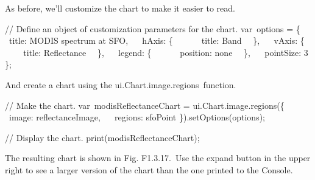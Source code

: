 \documentclass[
  letterpaper,
  DIV=11,
  numbers=noendperiod]{scrreprt}
\newenvironment{Shaded}{\begin{snugshade}}{\end{snugshade}}
\newcommand{\AttributeTok}[1]{\textcolor[rgb]{0.40,0.45,0.13}{#1}}
\newcommand{\CommentTok}[1]{\textcolor[rgb]{0.37,0.37,0.37}{#1}}
\newcommand{\DataTypeTok}[1]{\textcolor[rgb]{0.68,0.00,0.00}{#1}}
\newcommand{\DecValTok}[1]{\textcolor[rgb]{0.68,0.00,0.00}{#1}}
\newcommand{\FunctionTok}[1]{\textcolor[rgb]{0.28,0.35,0.67}{#1}}
\newcommand{\NormalTok}[1]{\textcolor[rgb]{0.00,0.23,0.31}{#1}}
\newcommand{\OperatorTok}[1]{\textcolor[rgb]{0.37,0.37,0.37}{#1}}
\newcommand{\StringTok}[1]{\textcolor[rgb]{0.13,0.47,0.30}{#1}}
\begin{document}
As before, we'll customize the chart to make it easier to read.

\begin{Shaded}
\begin{Highlighting}[]
\CommentTok{// Define an object of customization parameters for the chart.  }
\NormalTok{var options }\OperatorTok{=}\NormalTok{ \{  }
  \DataTypeTok{ title}\OperatorTok{:} \StringTok{\textquotesingle{}MODIS spectrum at SFO\textquotesingle{}}\OperatorTok{,}  
  \DataTypeTok{ hAxis}\OperatorTok{:}\NormalTok{ \{  }
      \DataTypeTok{ title}\OperatorTok{:} \StringTok{\textquotesingle{}Band\textquotesingle{}}\NormalTok{   \}}\OperatorTok{,}  
  \DataTypeTok{ vAxis}\OperatorTok{:}\NormalTok{ \{  }
      \DataTypeTok{ title}\OperatorTok{:} \StringTok{\textquotesingle{}Reflectance\textquotesingle{}}\NormalTok{   \}}\OperatorTok{,}  
  \DataTypeTok{ legend}\OperatorTok{:}\NormalTok{ \{  }
      \DataTypeTok{ position}\OperatorTok{:} \StringTok{\textquotesingle{}none\textquotesingle{}}\NormalTok{   \}}\OperatorTok{,}  
  \DataTypeTok{ pointSize}\OperatorTok{:} \DecValTok{3}  
\NormalTok{\}}\OperatorTok{;}
\end{Highlighting}
\end{Shaded}

And create a chart using the ui.Chart.image.regions~function.

\begin{Shaded}
\begin{Highlighting}[]
\CommentTok{// Make the chart.  }
\NormalTok{var modisReflectanceChart }\OperatorTok{=}\NormalTok{ ui}\OperatorTok{.}\AttributeTok{Chart}\OperatorTok{.}\AttributeTok{image}\OperatorTok{.}\FunctionTok{regions}\NormalTok{(\{  }
  \DataTypeTok{ image}\OperatorTok{:}\NormalTok{ reflectanceImage}\OperatorTok{,}  
  \DataTypeTok{ regions}\OperatorTok{:}\NormalTok{ sfoPoint  }
\NormalTok{\})}\OperatorTok{.}\FunctionTok{setOptions}\NormalTok{(options)}\OperatorTok{;}  
  
\CommentTok{// Display the chart.  }
\FunctionTok{print}\NormalTok{(modisReflectanceChart)}\OperatorTok{;}
\end{Highlighting}
\end{Shaded}

The resulting chart is shown in Fig. F1.3.17.~Use the expand button in
the upper right to see a larger version of the chart than the one
printed to the Console.
\end{document}
